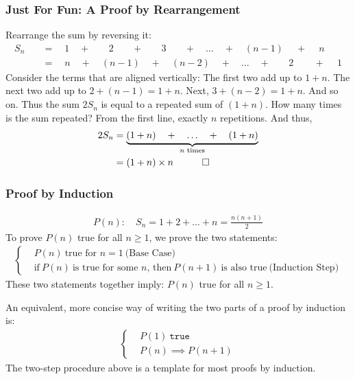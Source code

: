 \documentclass[12pt]{article}
\begin{document}
\subsubsection*{Just For Fun: A Proof by Rearrangement}
Rearrange the sum by reversing it:
\begin{align*}
S_{n}\quad & =\quad 1 \quad+\quad~~~~2 ~~~~\quad+\quad~~~~3 ~~~~\quad+\quad\ldots\quad+\quad(n-1) ~\quad+\quad~ n \\
      & =\quad n \quad+\quad (n-1) \quad+\quad (n-2) \quad+\quad\ldots\quad+\quad ~~~~2 ~~~~~\quad+\quad~ 1
\end{align*}
Consider the terms that are aligned vertically: The first two add up to $1+n$. The next two add up to $2+(n-1)=1+n$. Next, $3+(n-2)=1+n$. And so on. Thus the sum $2S_{n}$ is equal to a repeated sum of  $(1+n)$. How many times is the sum repeated? From the first line, exactly $n$ repetitions. And thus,
\begin{align*}
2 S_{n} 
  & = \underbrace{(1+n) \quad+\quad \ldots \quad+\quad (1+n)}_{\text{$n$ times}} \\
  & = (1+n) \times n \quad \qed
\end{align*}
\subsubsection*{Proof by Induction}
\begin{align*}
P(n): \quad
 S_{n} = 1 + 2 + \ldots + n = \frac{n(n+1)}{2}
\end{align*} 
To prove $P(n)$ true for all $n\geq1$, we prove the two statements:
\begin{align*}
\begin{cases}
& P(n) ~\text{true for $n=1$} ~\text{(Base Case)}\\
& \text{if}~P(n)~\text{is true for some $n$, then}~ P(n+1)~\text{is also true} ~\text{(Induction Step)}
\end{cases}
\end{align*}
These two statements together imply: $P(n)$ true for all $n\geq1$.

An equivalent, more concise way of writing the two parts of a proof by induction is:
\begin{align*}
\begin{cases}
& P(1) ~\texttt{true} \\
& P(n) \implies P(n+1)
\end{cases}
\end{align*}
The two-step procedure above is a template for most proofs by induction. 
\end{document}
